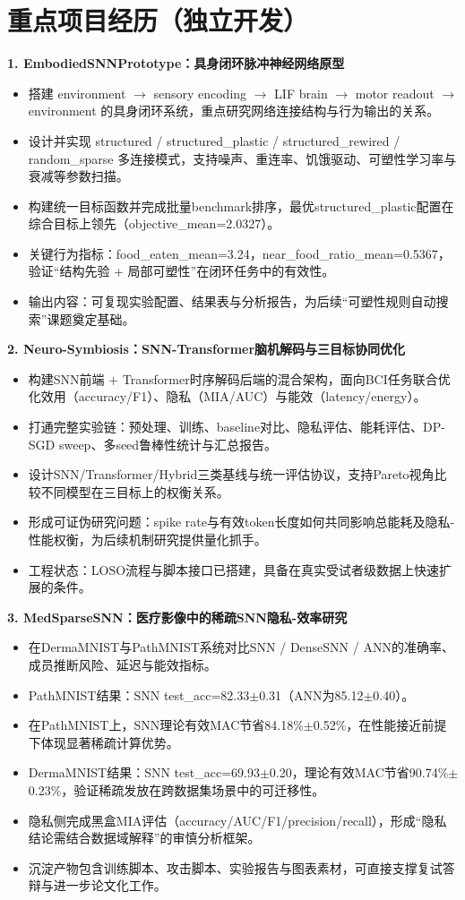 \documentclass[11pt,a4paper]{ctexart}
\begin{document}
\section*{重点项目经历（独立开发）}
\textbf{1. EmbodiedSNNPrototype：具身闭环脉冲神经网络原型}
\begin{itemize}
  \item 搭建 environment $\rightarrow$ sensory encoding $\rightarrow$ LIF brain $\rightarrow$ motor readout $\rightarrow$ environment 的具身闭环系统，重点研究网络连接结构与行为输出的关系。
  \item 设计并实现 structured / structured\_plastic / structured\_rewired / random\_sparse 多连接模式，支持噪声、重连率、饥饿驱动、可塑性学习率与衰减等参数扫描。
  \item 构建统一目标函数并完成批量benchmark排序，最优structured\_plastic配置在综合目标上领先（objective\_mean=2.0327）。
  \item 关键行为指标：food\_eaten\_mean=3.24，near\_food\_ratio\_mean=0.5367，验证“结构先验 + 局部可塑性”在闭环任务中的有效性。
  \item 输出内容：可复现实验配置、结果表与分析报告，为后续“可塑性规则自动搜索”课题奠定基础。
\end{itemize}

\textbf{2. Neuro-Symbiosis：SNN-Transformer脑机解码与三目标协同优化}
\begin{itemize}
  \item 构建SNN前端 + Transformer时序解码后端的混合架构，面向BCI任务联合优化效用（accuracy/F1）、隐私（MIA/AUC）与能效（latency/energy）。
  \item 打通完整实验链：预处理、训练、baseline对比、隐私评估、能耗评估、DP-SGD sweep、多seed鲁棒性统计与汇总报告。
  \item 设计SNN/Transformer/Hybrid三类基线与统一评估协议，支持Pareto视角比较不同模型在三目标上的权衡关系。
  \item 形成可证伪研究问题：spike rate与有效token长度如何共同影响总能耗及隐私-性能权衡，为后续机制研究提供量化抓手。
  \item 工程状态：LOSO流程与脚本接口已搭建，具备在真实受试者级数据上快速扩展的条件。
\end{itemize}

\textbf{3. MedSparseSNN：医疗影像中的稀疏SNN隐私-效率研究}
\begin{itemize}
  \item 在DermaMNIST与PathMNIST系统对比SNN / DenseSNN / ANN的准确率、成员推断风险、延迟与能效指标。
  \item PathMNIST结果：SNN test\_acc=82.33$\pm$0.31（ANN为85.12$\pm$0.40）。
  \item 在PathMNIST上，SNN理论有效MAC节省84.18\%$\pm$0.52\%，在性能接近前提下体现显著稀疏计算优势。
  \item DermaMNIST结果：SNN test\_acc=69.93$\pm$0.20，理论有效MAC节省90.74\%$\pm$0.23\%，验证稀疏发放在跨数据集场景中的可迁移性。
  \item 隐私侧完成黑盒MIA评估（accuracy/AUC/F1/precision/recall），形成“隐私结论需结合数据域解释”的审慎分析框架。
  \item 沉淀产物包含训练脚本、攻击脚本、实验报告与图表素材，可直接支撑复试答辩与进一步论文化工作。
\end{itemize}
\end{document}
